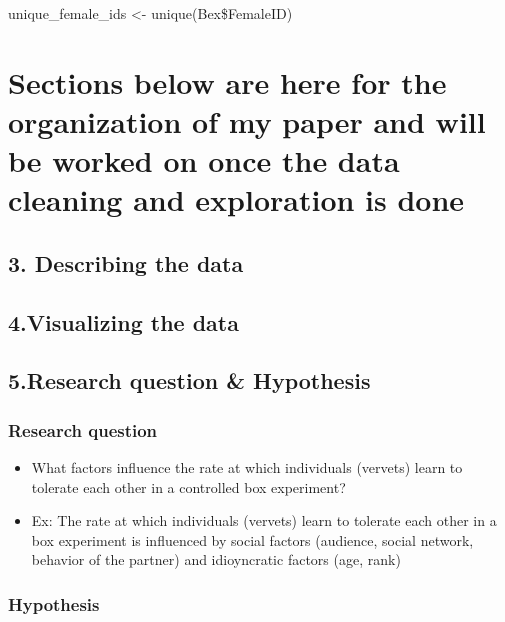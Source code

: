 \documentclass[
]{article}
\begin{document}
unique\_female\_ids \textless- unique(Bex\$FemaleID)

\hypertarget{sections-below-are-here-for-the-organization-of-my-paper-and-will-be-worked-on-once-the-data-cleaning-and-exploration-is-done}{%
\section{Sections below are here for the organization of my paper and
will be worked on once the data cleaning and exploration is
done}\label{sections-below-are-here-for-the-organization-of-my-paper-and-will-be-worked-on-once-the-data-cleaning-and-exploration-is-done}}

\hypertarget{describing-the-data}{%
\subsection{3. Describing the data}\label{describing-the-data}}

\hypertarget{visualizing-the-data}{%
\subsection{4.Visualizing the data}\label{visualizing-the-data}}

\hypertarget{research-question-hypothesis}{%
\subsection{5.Research question \&
Hypothesis}\label{research-question-hypothesis}}

\hypertarget{research-question}{%
\subsubsection{Research question}\label{research-question}}

\begin{itemize}
\item
  What factors influence the rate at which individuals (vervets) learn
  to tolerate each other in a controlled box experiment?
\item
  Ex: The rate at which individuals (vervets) learn to tolerate each
  other in a box experiment is influenced by social factors (audience,
  social network, behavior of the partner) and idioyncratic factors
  (age, rank)
\end{itemize}

\hypertarget{hypothesis}{%
\subsubsection{Hypothesis}\label{hypothesis}}
\end{document}
